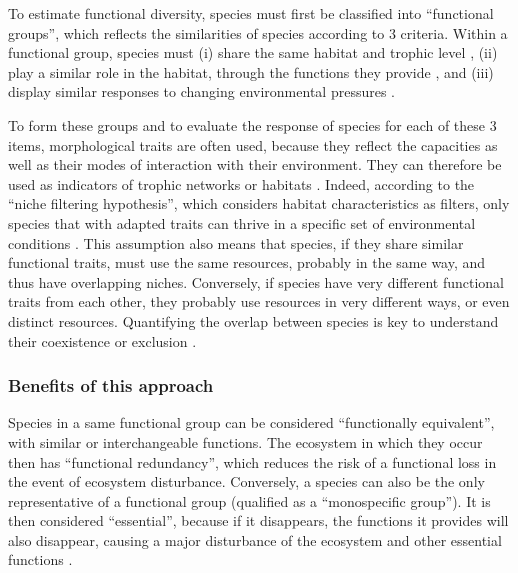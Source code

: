 To estimate functional diversity, species must first be classified into ``functional groups'', which reflects the similarities of species according to 3 criteria. Within a functional group, species must (i) share the same habitat and trophic level \citep{brindamour2016}, (ii) play a similar role in the habitat, through the functions they provide \citep{dumay2004,mejri2009}, and (iii) display similar responses to changing environmental pressures \citep{brindamour2016,dumay2004,mejri2009}.

To form these groups and to evaluate the response of species for each of these 3 items, morphological traits are often used, because they reflect the capacities as well as their modes of interaction with their environment. They can therefore be used as indicators of trophic networks or habitats \citep{brindamour2016}. Indeed, according to the “niche filtering hypothesis”, which considers habitat characteristics as filters, only species that with adapted traits can thrive in a specific set of environmental conditions \citep{brindamour2011,zobel1997}. This assumption also means that species, if they share similar functional traits, must use the same resources, probably in the same way, and thus have overlapping niches. Conversely, if species have very different functional traits from each other, they probably use resources in very different ways, or even distinct resources. Quantifying the overlap between species is key to understand their coexistence or exclusion \citep{costa-pereira2019}.

\subsubsection{Benefits of this approach}

Species in a same functional group can be considered ``functionally equivalent'', with similar or interchangeable functions. The ecosystem in which they occur then has ``functional redundancy'', which reduces the risk of a functional loss in the event of ecosystem disturbance. Conversely, a species can also be the only representative of a functional group (qualified as a ``monospecific group''). It is then considered ``essential'', because if it disappears, the functions it provides will also disappear, causing a major disturbance of the ecosystem and other essential functions \citep{mejri2009}. 

